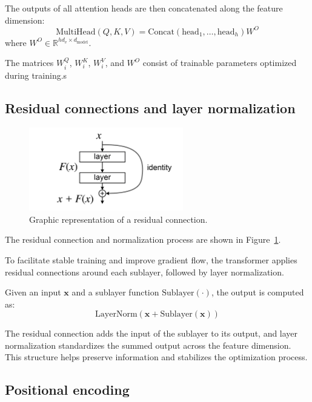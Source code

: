 \documentclass{pracalicmgr}
\begin{document}
The outputs of all attention heads are then concatenated along the feature dimension:
\[
\text{MultiHead}(Q, K, V) = \text{Concat}(\text{head}_1, \ldots, \text{head}_h)W^O
\]
where \( W^O \in \mathbb{R}^{hd_v \times d_{\text{model}}} \).

The matrices \( W^Q_i \), \( W^K_i \), \( W^V_i \), and \( W^O \) consist of trainable parameters optimized during training.s

\subsection{Residual connections and layer normalization}

\begin{figure}[h]
    \centering
    \includegraphics[width=0.6\textwidth]{src/ResBlock.png}
    \caption{Graphic representation of a residual connection.}
    \label{fig:resCon}
\end{figure}

The residual connection and normalization process are shown in Figure~\ref{fig:resCon}.

To facilitate stable training and improve gradient flow, the transformer applies residual connections around each sublayer, followed by layer normalization.

Given an input \( \mathbf{x} \) and a sublayer function \( \text{Sublayer}(\cdot) \), the output is computed as:
\[
\text{LayerNorm}(\mathbf{x} + \text{Sublayer}(\mathbf{x}))
\]

The residual connection adds the input of the sublayer to its output, and layer normalization standardizes the summed output across the feature dimension. This structure helps preserve information and stabilizes the optimization process.

\subsection{Positional encoding}
\end{document}
